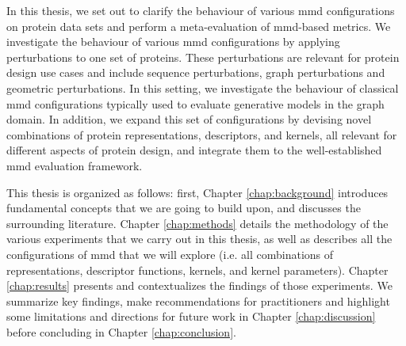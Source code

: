 In this thesis, we set out to clarify the behaviour of various \acrshort{mmd}
configurations on protein data sets and perform a meta-evaluation of \acrshort{mmd}-based
metrics. We investigate the behaviour of various \acrshort{mmd} configurations by applying
perturbations to one set of proteins. These perturbations are relevant for
protein design use cases and include sequence perturbations, graph perturbations
and geometric perturbations. In this setting, we investigate the behaviour of
classical \acrshort{mmd} configurations typically used to evaluate generative models in the
graph domain. In addition, we expand this set of configurations by devising
novel combinations of protein representations, descriptors, and kernels, all
relevant for different aspects of protein design, and integrate them to the
well-established \acrshort{mmd} evaluation framework.

This thesis is organized as follows: first, Chapter \ref{chap:background}
introduces fundamental concepts that we are going to build upon, and discusses
the surrounding literature. Chapter \ref{chap:methods} details the methodology
of the various experiments that we carry out in this thesis, as well as
describes all the configurations of \acrshort{mmd} that we will explore (i.e. all
combinations of representations, descriptor functions, kernels, and kernel
parameters). Chapter \ref{chap:results} presents and contextualizes the findings of those
experiments. We summarize key findings, make recommendations for practitioners and
highlight some limitations and directions for future work in Chapter
\ref{chap:discussion} before concluding in Chapter \ref{chap:conclusion}.





